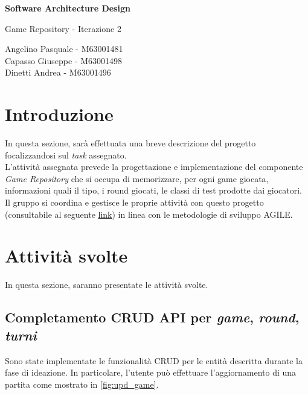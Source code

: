 \documentclass{article}
\begin{document}
\begin{titlepage}
    \begin{center}
        \vspace*{1cm}
            
        \Huge
        \textbf{Software Architecture Design}
            
        \vspace{0.5cm}
        \LARGE
        Game Repository - Iterazione 2
        
        \vfill
        \vspace{0.8cm}
        
        \Large
        Angelino Pasquale - M63001481 \\
        Capasso Giuseppe -  M63001498 \\
        Dinetti Andrea -  M63001496

    \end{center}
\end{titlepage}

\thispagestyle{empty}

\printglossaries

\newpage
\thispagestyle{empty}
\tableofcontents

\newpage
\thispagestyle{empty}
\section*{Introduzione}
In questa sezione, sarà effettuata una breve descrizione del progetto focalizzandosi sul \textit{task} assegnato.\\ 

L'attività assegnata prevede la progettazione e implementazione del componente \textit{Game Repository} che 
si occupa di memorizzare, per ogni \gls{game} giocata, informazioni quali il tipo, i \gls{round} giocati, 
le classi di test prodotte dai giocatori.\\

Il gruppo si coordina e gestisce le proprie attività con questo progetto
(consultabile al seguente \href{https://github.com/users/alarmfox/projects/2}{link}) in linea con le metodologie di sviluppo AGILE.

\newpage
\section{Attività svolte}
In questa sezione, saranno presentate le attività svolte.

\subsection{Completamento CRUD API per \textit{game}, \textit{round}, \textit{turni}}
Sono state implementate le funzionalità CRUD per le entità descritta durante la fase di ideazione.
In particolare, l'utente può effettuare l'aggiornamento di una partita come mostrato in \cref{fig:upd_game}. 
\end{document}
